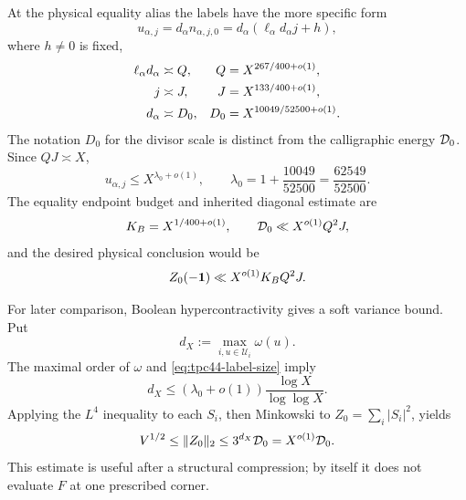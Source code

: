 At the physical equality alias the labels have the more specific form
\begin{equation}
 u_{\alpha,j}
 =d_\alpha n_{\alpha,j,0}
 =d_\alpha(\ell_\alpha d_\alpha j+h),
 \label{eq:tpc44-physical-label}
\end{equation}
where \(h\ne0\) is fixed,
\begin{align}
 \ell_\alpha d_\alpha&\asymp Q,
 &Q&=X^{267/400+o(1)},
 \notag\\
 j&\asymp J,
 &J&=X^{133/400+o(1)},
 \label{eq:tpc44-endpoint-scales}\\
 d_\alpha&\asymp D_0,
 &D_0&=X^{10049/52500+o(1)}.
 \notag
\end{align}
The notation \(D_0\) for the divisor scale is distinct from the
calligraphic energy \(\mathcal D_0\).  Since \(QJ\asymp X\),
\begin{equation}
 u_{\alpha,j}
 \le X^{\lambda_0+o(1)},
 \qquad
 \lambda_0=1+\frac{10049}{52500}
 =\frac{62549}{52500}.
 \label{eq:tpc44-label-size}
\end{equation}
The equality endpoint budget and inherited diagonal estimate are
\begin{equation}
 K_B=X^{1/400+o(1)},
 \qquad
 \mathcal D_0\ll X^{o(1)}Q^2J,
 \label{eq:tpc44-endpoint-budget}
\end{equation}
and the desired physical conclusion would be
\begin{equation}
 Z_0(-\mathbf 1)\ll X^{o(1)}K_BQ^2J.
 \label{eq:tpc44-physical-target}
\end{equation}

For later comparison, Boolean hypercontractivity
\citep{Bonami1970,Beckner1975,Harper2019HighMoments} gives a soft variance
bound.  Put
\begin{equation}
 d_X:=\max_{i,u\in\mathcal U_i}\omega(u).
 \label{eq:tpc44-label-degree}
\end{equation}
The maximal order of \(\omega\) and \eqref{eq:tpc44-label-size} imply
\begin{equation}
 d_X\le(\lambda_0+o(1))\frac{\log X}{\log\log X}.
 \label{eq:tpc44-degree-bound}
\end{equation}
Applying the \(L^4\) inequality to each \(S_i\), then Minkowski to
\(Z_0=\sum_i|S_i|^2\), yields
\begin{equation}
 V^{1/2}\le\|Z_0\|_2
 \le3^{d_X}\mathcal D_0=X^{o(1)}\mathcal D_0.
 \label{eq:tpc44-soft-variance}
\end{equation}
This estimate is useful after a structural compression; by itself it
does not evaluate \(F\) at one prescribed corner.

